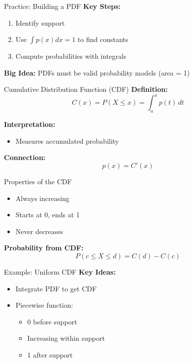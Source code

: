 \documentclass[dvipsnames]{beamer}
\begin{document}

\begin{frame}{Practice: Building a PDF}
\textbf{Key Steps:}
\begin{enumerate}
    \item Identify support
    \item Use $\int p(x)dx = 1$ to find constants
    \item Compute probabilities with integrals
\end{enumerate}

\textbf{Big Idea:}
PDFs must be valid probability models (area = 1)
\end{frame}


\begin{frame}{Cumulative Distribution Function (CDF)}
\textbf{Definition:}
\[
C(x) = P(X \le x) = \int_a^x p(t)\,dt
\]

\textbf{Interpretation:}
\begin{itemize}
    \item Measures accumulated probability
\end{itemize}

\textbf{Connection:}
\[
p(x) = C'(x)
\]
\end{frame}


\begin{frame}{Properties of the CDF}
\begin{itemize}
    \item Always increasing
    \item Starts at 0, ends at 1
    \item Never decreases
\end{itemize}

\textbf{Probability from CDF:}
\[
P(c \le X \le d) = C(d) - C(c)
\]
\end{frame}


\begin{frame}{Example: Uniform CDF}
\textbf{Key Ideas:}
\begin{itemize}
    \item Integrate PDF to get CDF
    \item Piecewise function:
    \begin{itemize}
        \item 0 before support
        \item Increasing within support
        \item 1 after support
    \end{itemize}
\end{itemize}
\end{frame}
\end{document}
